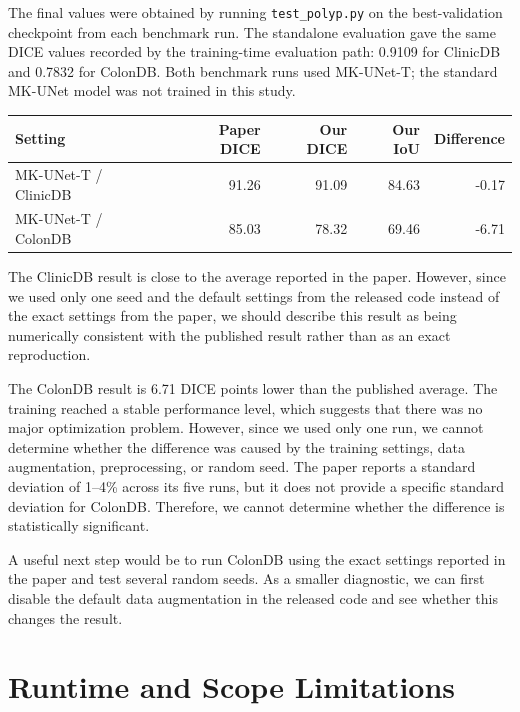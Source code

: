\documentclass[10pt,a4paper]{article}
\begin{document}
The final values were obtained by running \texttt{test\_polyp.py} on the best-validation checkpoint from each benchmark run. The standalone evaluation gave the same DICE values recorded by the training-time evaluation path: 0.9109 for ClinicDB and 0.7832 for ColonDB. Both benchmark runs used MK-UNet-T; the standard MK-UNet model was not trained in this study.

\begin{table}[h]
\centering\small
\begin{tabular}{@{}lrrrr@{}}
\toprule
Setting & Paper DICE & Our DICE & Our IoU & Difference \\
\midrule
MK-UNet-T / ClinicDB & 91.26 & 91.09 & 84.63 & -0.17 \\
MK-UNet-T / ColonDB & 85.03 & 78.32 & 69.46 & -6.71 \\
\bottomrule
\end{tabular}
\end{table}

The ClinicDB result is close to the average reported in the paper. However, since we used only one seed and the default settings from the released code instead of the exact settings from the paper, we should describe this result as being numerically consistent with the published result rather than as an exact reproduction.

The ColonDB result is 6.71 DICE points lower than the published average. The training reached a stable performance level, which suggests that there was no major optimization problem. However, since we used only one run, we cannot determine whether the difference was caused by the training settings, data augmentation, preprocessing, or random seed. The paper reports a standard deviation of 1--4\% across its five runs, but it does not provide a specific standard deviation for ColonDB. Therefore, we cannot determine whether the difference is statistically significant.

A useful next step would be to run ColonDB using the exact settings reported in the paper and test several random seeds. As a smaller diagnostic, we can first disable the default data augmentation in the released code and see whether this changes the result.

\section{Runtime and Scope Limitations}
\end{document}
